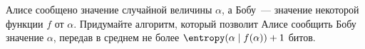 Алисе сообщено значение случайной величины $\alpha$, а Бобу~--- значение некоторой функции $f$ от
$\alpha$. Придумайте алгоритм, который позволит Алисе сообщить Бобу значение $\alpha$, передав в среднем
не более $\entropy(\alpha \mid f(\alpha)) + 1$ битов.